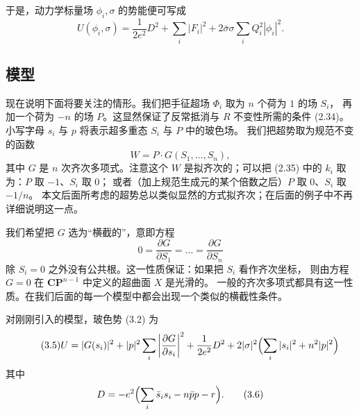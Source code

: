 于是，动力学标量场 $\phi_i,\sigma$ 的势能便可写成
\begin{equation}
U(\phi_i,\sigma)=\frac{1}{2e^2}D^2+\sum_i|F_i|^2+2\bar\sigma\sigma\sum_i Q_i^2|\phi_i|^2.
\tag{3.2}
\end{equation}

\label{op:17}

\subsection{模型}

现在说明下面将要关注的情形。我们把手征超场 $\Phi_i$ 取为 $n$ 个荷为 $1$ 的场 $S_i$，
再加一个荷为 $-n$ 的场 $P$。这显然保证了反常抵消与 $R$ 不变性所需的条件 (2.34)。
小写字母 $s_i$ 与 $p$ 将表示超多重态 $S_i$ 与 $P$ 中的玻色场。
我们把超势取为规范不变的函数
\begin{equation}
W=P\cdot G(S_1,\dots,S_n),
\tag{3.3}
\end{equation}
其中 $G$ 是 $n$ 次齐次多项式。注意这个 $W$ 是拟齐次的；可以把 (2.35) 中的 $k_i$ 取为：$P$ 取 $-1$、$S_i$ 取 $0$；
或者（加上规范生成元的某个倍数之后）$P$ 取 $0$、$S_i$ 取 $-1/n$。
本文后面所考虑的超势总以类似显然的方式拟齐次；在后面的例子中不再详细说明这一点。

我们希望把 $G$ 选为“横截的”，意即方程
\begin{equation}
0=\frac{\partial G}{\partial S_1}=\dots=\frac{\partial G}{\partial S_n}
\tag{3.4}
\end{equation}
除 $S_i=0$ 之外没有公共根。这一性质保证：如果把 $S_i$ 看作齐次坐标，
则由方程 $G=0$ 在 $\mathbf{CP}^{n-1}$ 中定义的超曲面 $X$ 是光滑的。
一般的齐次多项式都具有这一性质。在我们后面的每一个模型中都会出现一个类似的横截性条件。

对刚刚引入的模型，玻色势 (3.2) 为
\begin{equation}
\tag{3.5}
U=|G(s_i)|^2+|p|^2\sum_i\left|\frac{\partial G}{\partial s_i}\right|^2
+\frac{1}{2e^2}D^2+2|\sigma|^2\Bigl(\sum_i|s_i|^2+n^2|p|^2\Bigr)
\end{equation}
其中
\begin{equation}
D=-e^2\Bigl(\sum_i\bar s_is_i-n\bar pp-r\Bigr).
\tag{3.6}
\end{equation}

